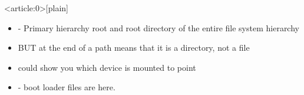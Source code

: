\documentclass[usenames,dvipsnames,10pt,aspectratio=169]{beamer}
\begin{document}
{ %
    \begin{frame}<article:0>[plain]
     \end{frame}
}

\begin{frame}
    \begin{itemize}
        \item \ex{/} - Primary hierarchy root and root directory of the entire file system hierarchy
        \item BUT \ex{/} at the end of a path means that it is a directory, not a file
        \item {} could show you which device is mounted to  point
        \item {} - boot loader files are here. 
    \end{itemize}
\end{frame}
\end{document}
